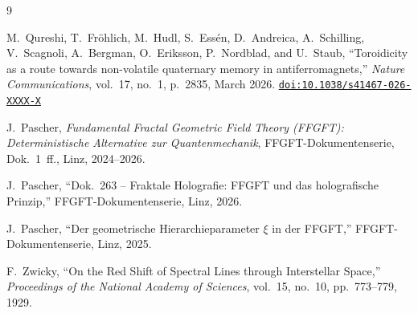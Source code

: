\begin{thebibliography}{9}

  M.~Qureshi, T.~Fröhlich, M.~Hudl, S.~Essén, D.~Andreica, A.~Schilling,
  V.~Scagnoli, A.~Bergman, O.~Eriksson, P.~Nordblad, and U.~Staub,
  ``Toroidicity as a route towards non-volatile quaternary memory
  in antiferromagnets,''
  \emph{Nature Communications}, vol.~17, no.~1, p.~2835, March 2026.
  \href{https://doi.org/10.1038/s41467-026-XXXX-X}{\texttt{doi:10.1038/s41467-026-XXXX-X}}

  J.~Pascher,
  \emph{Fundamental Fractal Geometric Field Theory (FFGFT):
  Deterministische Alternative zur Quantenmechanik},
  FFGFT-Dokumentenserie, Dok.~1~ff., Linz, 2024--2026.

  J.~Pascher,
  ``Dok.~263 -- Fraktale Holografie: FFGFT und das holografische Prinzip,''
  FFGFT-Dokumentenserie, Linz, 2026.

  J.~Pascher,
  ``Der geometrische Hierarchieparameter $\xi$ in der FFGFT,''
  FFGFT-Dokumentenserie, Linz, 2025.

  F.~Zwicky,
  ``On the Red Shift of Spectral Lines through Interstellar Space,''
  \emph{Proceedings of the National Academy of Sciences},
  vol.~15, no.~10, pp.~773--779, 1929.

\end{thebibliography}
